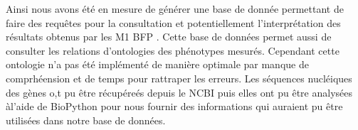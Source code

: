 \documentclass[11pt,french,]{article}
\begin{document}
Ainsi nous avons été en mesure de générer une base de donnée permettant
de faire des requêtes pour la consultation et potentiellement
l'interprétation des résultats obtenus par les M1 BFP . Cette base de
données permet aussi de consulter les relations d'ontologies des
phénotypes mesurés. Cependant cette ontologie n'a pas été implémenté de
manière optimale par manque de comprhéension et de temps pour rattraper
les erreurs. Les séquences nucléiques des gènes o,t pu être récupéreés
depuis le NCBI puis elles ont pu être analysées àl'aide de BioPython
pour nous fournir des informations qui auraient pu être utilisées dans
notre base de données.
\end{document}
